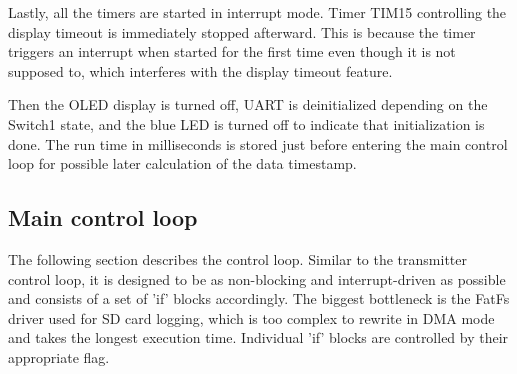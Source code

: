 Lastly, all the timers are started in interrupt mode. Timer TIM15 controlling the display timeout is immediately stopped afterward. This is because the timer triggers an interrupt when started for the first time even though it is not supposed to, which interferes with the display timeout feature.

Then the OLED display is turned off, UART is deinitialized depending on the Switch1 state, and the blue LED is turned off to indicate that initialization is done. The run time in milliseconds is stored just before entering the main control loop for possible later calculation of the data timestamp.

\subsection{Main control loop}
The following section describes the control loop. Similar to the transmitter control loop, it is designed to be as non-blocking and interrupt-driven as possible and consists of a set of 'if' blocks accordingly. The biggest bottleneck is the FatFs driver used for SD card logging, which is too complex to rewrite in DMA mode and takes the longest execution time. Individual 'if' blocks are controlled by their appropriate flag.

